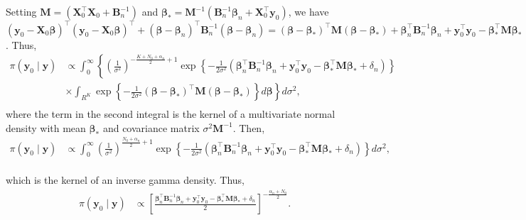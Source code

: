 Setting ${\bm{M}}=({\bm{X}}_0^{\top}{\bm{X}}_0+{\bm{B}}_n^{-1})$ and $\bm{\beta}_*={\bm{M}}^{-1}({\bm{B}}_n^{-1}\bm{\beta}_n+{\bm{X}}_0^{\top}{\bm{y}}_0)$, we have
$({\bm{y}}_0 - {\bm{X}}_0\bm{\beta})^{\top}({\bm{y}}_0 - {\bm{X}}_0\bm{\beta})^{\top}+(\bm{\beta} - \bm{\beta}_n)^{\top}{\bm{B}}_n^{-1}(\bm{\beta} - \bm{\beta}_n)=(\bm{\beta} - \bm{\beta}_*)^{\top}{\bm{M}}(\bm{\beta} - \bm{\beta}_*)+\bm{\beta}_n^{\top}{\bm{B}}_n^{-1}\bm{\beta}_n+{\bm{y}}_0^{\top}{\bm{y}}_0-\bm{\beta}_*^{\top}{\bm{M}}\bm{\beta}_*$.
Thus, 
{\footnotesize{
\begin{align*}
	\pi({\bm{y}}_0\mid {\bm{y}})&\propto\int_{0}^{\infty}\left\{\left(\frac{1}{\sigma^2}\right)^{-\frac{K+N_0+\alpha_n}{2}+1}\exp\left\{-\frac{1}{2\sigma^2}(\bm{\beta}_n^{\top}{\bm{B}}_n^{-1}\bm{\beta}_n+{\bm{y}}_0^{\top}{\bm{y}}_0-\bm{\beta}_*^{\top}{\bm{M}}\bm{\beta}_*+\delta_n)\right\}\right.\\
	&\times\left.\int_{R^K}\exp\left\{-\frac{1}{2\sigma^2}(\bm{\beta} - \bm{\beta}_*)^{\top}{\bm{M}}(\bm{\beta} - \bm{\beta}_*)\right\}d\bm{\beta}\right\} d\sigma^2,\\
\end{align*}
}}
where the term in the second integral is the kernel of a multivariate normal density with mean $\bm{\beta}_*$ and covariance matrix $\sigma^2{\bm{M}}^{-1}$. Then,
\begin{align*}
	\pi({\bm{y}}_0\mid {\bm{y}})&\propto\int_{0}^{\infty}\left(\frac{1}{\sigma^2}\right)^{\frac{N_0+\alpha_n}{2}+1}\exp\left\{-\frac{1}{2\sigma^2}(\bm{\beta}_n^{\top}{\bm{B}}_n^{-1}\bm{\beta}_n+{\bm{y}}_0^{\top}{\bm{y}}_0-\bm{\beta}_*^{\top}{\bm{M}}\bm{\beta}_*+\delta_n)\right\}d\sigma^2,\\
\end{align*}

which is the kernel of an inverse gamma density. Thus,
\begin{align*}
	\pi({\bm{y}}_0\mid {\bm{y}})&\propto \left[\frac{\bm{\beta}_n^{\top}{\bm{B}}_n^{-1}\bm{\beta}_n+{\bm{y}}_0^{\top}{\bm{y}}_0-\bm{\beta}_*^{\top}{\bm{M}}\bm{\beta}_*+\delta_n}{2}\right]^{-\frac{\alpha_n+N_0}{2}}.
\end{align*}

